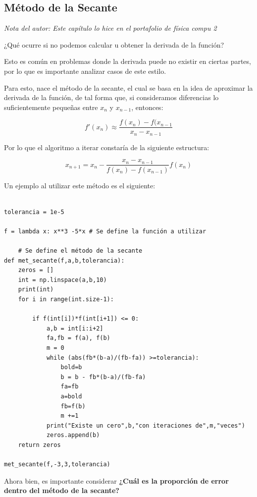 \subsection{Método de la Secante}

\textit{Nota del autor: Este capítulo lo hice en el portafolio de física compu 2}

¿Qué ocurre si no podemos calcular u obtener la derivada de la función?

Esto es común en problemas donde la derivada puede no existir en ciertas partes, por lo que es importante analizar casos de este estilo.

Para esto, nace el método de la secante, el cual se basa en la idea de aproximar la derivada de la función, de tal forma que, si consideramos diferencias lo suficientemente pequeñas entre $x_n$ y $x_{n-1}$, entonces:

\begin{equation}
    f'(x_n) \approx \frac{f(x_n) - f(x_{n-1}}{x_n - x_{n-1}}
\end{equation}

Por lo que el algoritmo a iterar constaría de la siguiente estructura:

\begin{equation} \label{metodo_secante}
x_{n+1} = x_n - \frac{x_n - x_{n-1}}{f(x_n) - f(x_{n-1})}f(x_n)
\end{equation}

Un ejemplo al utilizar este método es el siguiente:

\begin{lstlisting}

tolerancia = 1e-5

f = lambda x: x**3 -5*x # Se define la función a utilizar

    # Se define el método de la secante
def met_secante(f,a,b,tolerancia):
    zeros = []
    int = np.linspace(a,b,10)
    print(int)
    for i in range(int.size-1): 

        if f(int[i])*f(int[i+1]) <= 0:
            a,b = int[i:i+2]
            fa,fb = f(a), f(b)
            m = 0
            while (abs(fb*(b-a)/(fb-fa)) >=tolerancia):
                bold=b 
                b = b - fb*(b-a)/(fb-fa) 
                fa=fb 
                a=bold
                fb=f(b) 
                m +=1
            print("Existe un cero",b,"con iteraciones de",m,"veces")
            zeros.append(b)
    return zeros

met_secante(f,-3,3,tolerancia)

\end{lstlisting}

Ahora bien, es importante considerar \textbf{¿Cuál es la proporción de error dentro del método de la secante?}



